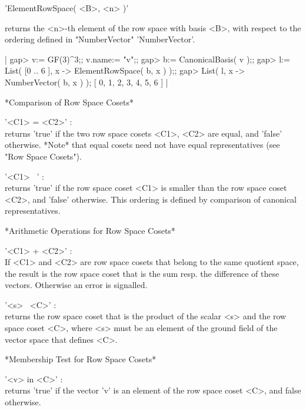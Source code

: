 
'ElementRowSpace( <B>, <n> )'

returns the <n>-th element of the row space with basis <B>, with respect
to the ordering defined in "NumberVector" 'NumberVector'.

|    gap> v:= GF(3)^3;; v.name:= "v";;
    gap> b:= CanonicalBasis( v );;
    gap> l:= List( [0 .. 6 ], x -> ElementRowSpace( b, x ) );;
    gap> List( l, x -> NumberVector( b, x ) );
    [ 0, 1, 2, 3, 4, 5, 6 ] |


*Comparison of Row Space Cosets*

'<C1> = <C2>' : \\
    returns 'true' if the two row space cosets <C1>, <C2> are equal, and
    'false' otherwise.
    *Note* that equal cosets need not have equal representatives (see
    "Row Space Cosets").

'<C1> \<\ <C2>' : \\
    returns 'true' if the row space coset <C1> is smaller than the row space
    coset <C2>, and 'false' otherwise.  This ordering is defined by
    comparison of canonical representatives.

\vspace{5mm}

*Arithmetic Operations for Row Space Cosets*

'<C1> + <C2>' : \\
    If <C1> and <C2> are row space cosets that belong to the same quotient
    space, the result is the row space coset that is the sum resp. the
    difference of these vectors.  Otherwise an error is signalled.

'<s> \*\ <C>' : \\
    returns the row space coset that is the product of the scalar <s> and
    the row space coset <C>, where <s> must be an element of the ground
    field of the vector space that defines <C>.

\vspace{5mm}

*Membership Test for Row Space Cosets*

'<v> in <C>' : \\
    returns 'true' if the vector 'v' is an element of the row space coset
    <C>, and false otherwise.

